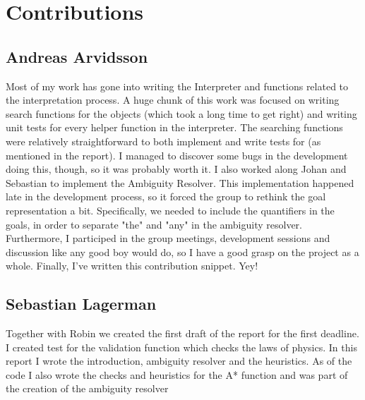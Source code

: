\section*{Contributions}
\subsection*{Andreas Arvidsson}
Most of my work has gone into writing the Interpreter and functions related to the interpretation process.
A huge chunk of this work was focused on writing search functions for the objects (which took a long time to get right) and writing unit tests for every helper function in the interpreter.
The searching functions were relatively straightforward to both implement and write tests for (as mentioned in the report).
I managed to discover some bugs in the development doing this, though, so it was probably worth it.
\newline
\newline
I also worked along Johan and Sebastian to implement the Ambiguity Resolver. This implementation happened late in the development process, so it forced the group to rethink the goal representation a bit. Specifically, we needed to include the quantifiers in the goals, in order to separate "the" and "any" in the ambiguity resolver.
\newline
\newline
Furthermore, I participed in the group meetings, development sessions and discussion like any good boy would do, so I have a good grasp on the project as a whole.
\newline
\newline
Finally, I've written this contribution snippet. Yey!

\subsection*{Sebastian Lagerman}
Together with Robin we created the first draft of the report for the first deadline.
\newline
\newline
I created test for the validation function which checks the laws of physics.
\newline
\newline
In this report I wrote the introduction, ambiguity resolver and the heuristics.
\newline
\newline
As of the code I also wrote the checks and heuristics for the A* function and was part of the creation of the ambiguity resolver

